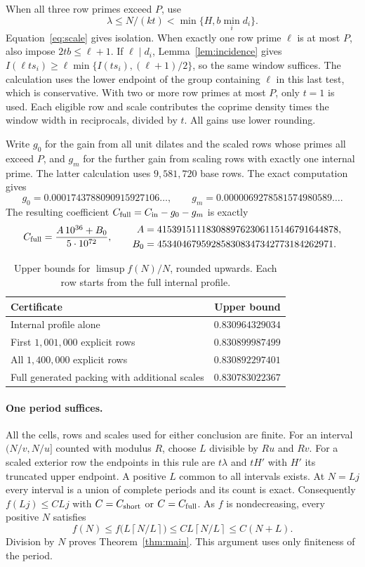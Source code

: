 \documentclass[11pt,letterpaper]{article}
\theoremstyle{definition}
\newcommand{\cin}{C_{\rm in}}
\newcommand{\cshort}{C_{\rm short}}
\newcommand{\cfull}{C_{\rm full}}
\newcommand{\ceil}[1]{\left\lceil #1\right\rceil}
\begin{document}
When all three row primes exceed $P$, use
\[
  \lambda\le N/(kt)<\min\{H,b\min_i d_i\}.
\]
Equation~\eqref{eq:scale} gives isolation. When exactly one row prime
$\ell$ is at most $P$, also impose $2tb\le\ell+1$. If $\ell\mid d_i$,
Lemma~\ref{lem:incidence} gives
$I(\ell t s_i)\ge\ell\min\{I(ts_i),(\ell+1)/2\}$, so the same window
suffices. The calculation uses the lower endpoint of the group containing
$\ell$ in this last test, which is conservative. With two or more row
primes at most $P$, only $t=1$ is used. Each eligible row and scale
contributes the coprime density times the window width in reciprocals,
divided by $t$. All gains use lower rounding.

Write $g_0$ for the gain from all unit dilates and the scaled rows
whose primes all exceed $P$, and $g_m$ for the further gain from
scaling rows with exactly one internal prime. The latter calculation
uses $9{,}581{,}720$ base rows. The exact computation gives
\[
 g_0=0.0001743788090915927106\ldots,\qquad
 g_m=0.0000069278581574980589\ldots.
\]
The resulting coefficient $\cfull=\cin-g_0-g_m$ is exactly
\[
 \cfull=\frac{A\,10^{36}+B_0}{5\cdot10^{72}},\qquad
 \begin{aligned}
 A   &=4153915111830889762306115146791644878,\\
 B_0 &=453404679592858308347342773184262971 .
 \end{aligned}
\]

\begin{table}[ht]
\centering\small
\caption{Upper bounds for $\limsup f(N)/N$, rounded upwards. Each row
starts from the full internal profile.}\label{tab:results}
\begin{tabular}{@{}lr@{}}
\toprule
Certificate & Upper bound \\
\midrule
Internal profile alone & $0.830964329034$\\
First $1{,}001{,}000$ explicit rows & $0.830899987499$\\
All $1{,}400{,}000$ explicit rows & $0.830892297401$\\
Full generated packing with additional scales & $0.830783022367$\\
\bottomrule
\end{tabular}
\end{table}

\paragraph{One period suffices.}
All the cells, rows and scales used for either conclusion are finite.
For an interval $(N/v,N/u]$ counted with modulus $R$, choose $L$
divisible by $Ru$ and $Rv$. For a scaled exterior row the endpoints
in this rule are $t\lambda$ and $tH'$ with $H'$ its truncated upper
endpoint. A positive $L$ common to all intervals exists. At $N=Lj$
every interval is a union of complete periods and its count is exact.
Consequently $f(Lj)\le C Lj$ with $C=\cshort$ or $C=\cfull$.
As $f$ is nondecreasing, every positive $N$ satisfies
\[
 f(N)\le f\bigl(L\ceil{N/L}\bigr)
       \le C L\ceil{N/L}\le C(N+L).
\]
Division by $N$ proves Theorem~\ref{thm:main}. This argument uses
only finiteness of the period.
\end{document}
